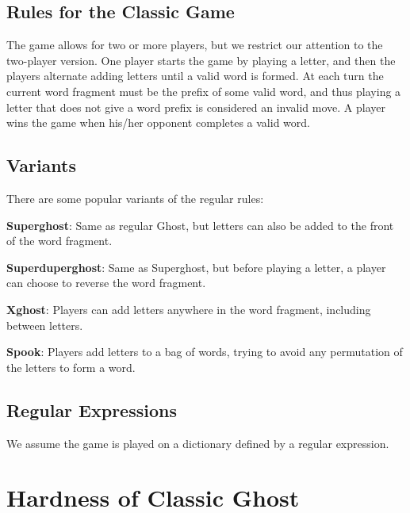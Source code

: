 \documentclass[runningheads,a4paper]{llncs}
\begin{document}
\subsection{Rules for the Classic Game}

	The game allows for two or more players, but we restrict our attention to the two-player version. One player starts the game by playing a letter, and then the players alternate adding letters until a valid word is formed. At each turn the current word fragment must be the prefix of some valid word, and thus playing a letter that does not give a word prefix is considered an invalid move. A player wins the game when his/her opponent completes a valid word. 

% 

\subsection{Variants}

There are some popular variants of the regular rules:

\textbf{Superghost}: Same as regular Ghost, but letters can also be added to the front of the word fragment.

\textbf{Superduperghost}: Same as Superghost, but before playing a letter, a player can choose to reverse the word fragment.

\textbf{Xghost}: Players can add letters anywhere in the word fragment, including between letters.

\textbf{Spook}: Players add letters to a bag of words, trying to avoid any permutation of the letters to form a word. 

\subsection{Regular Expressions}

We assume the game is played on a dictionary defined by a regular expression. 

\section{Hardness of Classic Ghost}
\label{Hardness of Classic Ghost}
\end{document}
